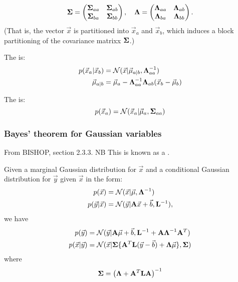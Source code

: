 \documentclass[11pt]{article}
\begin{document}
\begin{appendices}
\begin{equation}
  \boldsymbol{\Sigma} =
  \left(
    \begin{matrix}
      \boldsymbol{\Sigma}_{aa} & \boldsymbol{\Sigma}_{ab} \\
      \boldsymbol{\Sigma}_{ba} & \boldsymbol{\Sigma}_{bb}
    \end{matrix}
  \right)
  , \quad
  \boldsymbol{\Lambda} =
  \left(
    \begin{matrix}
      \boldsymbol{\Lambda}_{aa} & \boldsymbol{\Lambda}_{ab} \\
      \boldsymbol{\Lambda}_{ba} & \boldsymbol{\Lambda}_{bb}
    \end{matrix}
  \right).
\end{equation}
(That is, the vector $\vec{x}$ is partitioned into $\vec{x}_a$ and $\vec{x}_b$, which
induces a block partitioning of the covariance matrixx $\boldsymbol{\Sigma}$.)

The  is:
\begin{align}
  p(\vec{x}_a | \vec{x}_b) &= \mathcal{N}(\vec{x} | \vec{\mu}_{a | b},
                              \boldsymbol{\Lambda}_{aa}^{-1}) \\ 
  \vec{\mu}_{a | b}        &= \vec{\mu}_a - \boldsymbol{\Lambda}_{aa}^{-1} \boldsymbol{\Lambda}_{ab}
                              (\vec{x}_b - \vec{\mu}_b) 
\end{align}

The  is:
\begin{equation}
  p(\vec{x}_a) = \mathcal{N}(\vec{x}_a | \vec{\mu}_a, \boldsymbol{\Sigma}_{aa})
\end{equation}

\subsubsection{Bayes' theorem for Gaussian variables}
From BISHOP, section 2.3.3. NB This is known as a .

Given a marginal Gaussian distribution for $\vec{x}$ and a conditional Gaussian distribution
for $\vec{y}$ given $\vec{x}$ in the form:
\begin{align}
  p(\vec{x})         &= \mathcal{N}(\vec{x} | \vec{\mu}, \boldsymbol{\Lambda}^{-1}) \\
  p(\vec{y}|\vec{x}) &= \mathcal{N}(\vec{y} | \mathbf{A} \vec{x} + \vec{b}, \mathbf{L}^{-1}),
\end{align}
we have
\begin{align}
  p(\vec{y})         &= \mathcal{N} (\vec{y} |\mathbf{A} \vec{\mu} + \vec{b}, \mathbf{L}^{-1}
                        + \mathbf{A}\boldsymbol{\Lambda}^{-1} \mathbf{A}^T ) \\
  p(\vec{x}|\vec{y}) &= \mathcal{N} ( \vec{x} | \boldsymbol{\Sigma} \{ \mathbf{A}^T \mathbf{L}
                        (\vec{y} - \vec{b}) + \boldsymbol{\Lambda} \vec{\mu} \}, \boldsymbol{\Sigma})
\end{align}
where
\begin{equation}
  \boldsymbol{\Sigma} = \left(\boldsymbol{\Lambda} + \mathbf{A}^T \mathbf{LA} \right)^{-1}
\end{equation}



\end{appendices}
\end{document}
